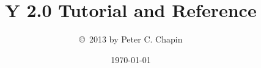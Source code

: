 \documentclass{report}
\begin{document}
\newcommand{\filename}[1]{\texttt{#1}}
\newcommand{\press}[1]{\texttt{#1}}

\title{Y 2.0 Tutorial and Reference}
\author{\copyright\ 2013 by Peter C. Chapin}
\date{\today}
\maketitle

\tableofcontents
\newpage
{}










\end{document}
